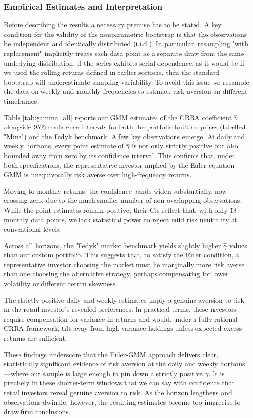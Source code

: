 \subsubsection{Empirical Estimates and Interpretation}
\label{sec:gamma_estimates}
Before describing the results a necessary premise has to be stated.
A key condition for the validity of the nonparametric bootstrap is that the observations be independent and identically distributed (i.i.d.).  
In particular, resampling "with replacement" implicitly treats each data point as a separate draw from the same underlying distribution.  
If the series exhibits serial dependence, as it would be if we used the rolling returns defined in earlier sections, then the standard bootstrap will underestimate sampling variability.  
To avoid this issue we resample the data on weekly and monthly frequencies to estimate risk aversion on different timeframes.

Table \ref{tab:gamma_all} reports our GMM estimates of the CRRA coefficient $\hat\gamma$ alongside 95\% confidence intervals for both the portfolio built on prices (labelled "Mine") and the Fedyk benchmark.  
A few key observations emerge.
At daily and weekly horizons, every point estimate of $\hat\gamma$ is not only strictly positive but also bounded away from zero by its confidence interval.  
This confirms that, under both specifications, the representative investor implied by the Euler-equation GMM is unequivocally risk averse over high-frequency returns.

Moving to monthly returns, the confidence bands widen substantially, now crossing zero, due to the much smaller number of non-overlapping observations.  
While the point estimates remain positive, their CIs reflect that, with only \~18 monthly data points, we lack statistical power to reject mild risk neutrality at conventional levels.

Across all horizons, the "Fedyk" market benchmark yields slightly higher $\hat\gamma$ values than our custom portfolio.  
This suggests that, to satisfy the Euler condition, a representative investor choosing the market must be marginally more risk averse than one choosing the alternative strategy, perhaps compensating for lower volatility or different return skewness.

The strictly positive daily and weekly estimates imply a genuine aversion to risk in the retail investor's revealed preferences.  
In practical terms, these investors require compensation for variance in returns and would, under a fully rational CRRA framework, tilt away from high-variance holdings unless expected excess returns are sufficient.

These findings underscore that the Euler-GMM approach delivers clear, statistically significant evidence of risk aversion at the daily and weekly horizons—where our sample is large enough to pin down a strictly positive $\gamma$.  
It is precisely in these shorter-term windows that we can say with confidence that retail investors reveal genuine aversion to risk.  
As the horizon lengthens and observations dwindle, however, the resulting estimates become too imprecise to draw firm conclusions.


